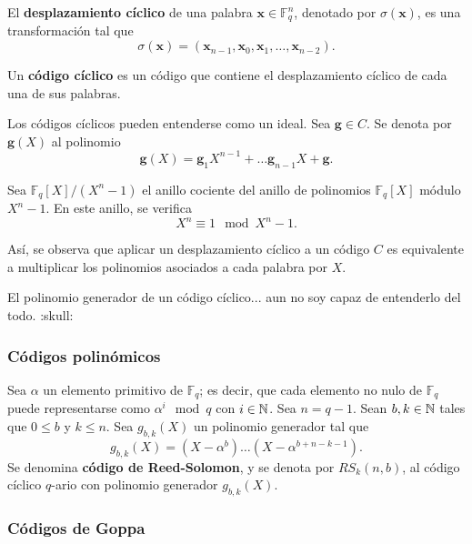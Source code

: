 \begin{definition}
	El \textbf{desplazamiento cíclico} de una palabra $\textbf{x} \in \mathbb{F}_q^n$, denotado por $\sigma(\textbf{x})$, es una transformación tal que
	\[\sigma(\textbf{x}) = (\textbf{x}_{n-1}, \textbf{x}_0, \textbf{x}_1, \dots, \textbf{x}_{n-2}).\]
\end{definition}

\begin{definition}
	Un \textbf{código cíclico} es un código que contiene el desplazamiento cíclico de cada una de sus palabras.
\end{definition}

\begin{remark}
	Los códigos cíclicos pueden entenderse como un ideal. Sea $\textbf{g} \in C$. Se denota por $\textbf{g}(X)$ al polinomio
	\[\textbf{g}(X) = \textbf{g}_1X^{n-1} + \hdots \textbf{g}_{n-1}X + \textbf{g}.\]
	
	Sea $\mathbb{F}_q[X] / (X^n - 1)$ el anillo cociente del anillo de polinomios $\mathbb{F}_q[X]$ módulo $X^n - 1$. En este anillo, se verifica
	\[X^n \equiv 1 \mod X^n - 1.\]
	
	Así, se observa que aplicar un desplazamiento cíclico a un código $C$ es equivalente a multiplicar los polinomios asociados a cada palabra por $X$.
\end{remark}

\begin{definition}
	El polinomio generador de un código cíclico... aun no soy capaz de entenderlo del todo. :skull:
\end{definition}

\subsubsection{Códigos polinómicos}

\begin{definition}
	Sea $\alpha$ un elemento primitivo de $\mathbb{F}_q$; es decir, que cada elemento no nulo de $\mathbb{F}_q$ puede representarse como $\alpha^i \mod q$ con $i \in \mathbb{N}$. Sea $n = q - 1$. Sean $b, k \in \mathbb{N}$ tales que $0 \leq b$ y $k \leq n$. Sea $g_{b,k}(X)$ un polinomio generador tal que
	\[g_{b,k}(X) = (X - \alpha^b)\hdots(X - \alpha^{b+n-k-1}).\]
	Se denomina \textbf{código de Reed-Solomon}, y se denota por $RS_k(n, b)$, al código cíclico $q$-ario con polinomio generador $g_{b,k}(X)$.
\end{definition}

\subsubsection{Códigos de Goppa}

